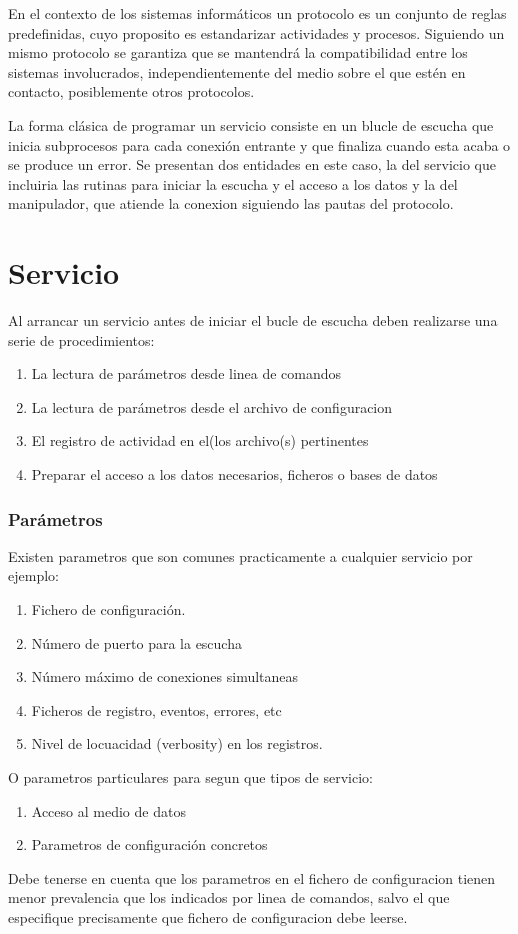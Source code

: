 \documentclass[a4paper,spanish,12pt]{book}
\begin{document}
En el contexto de los sistemas informáticos un protocolo es un conjunto de reglas predefinidas, cuyo proposito es estandarizar actividades y procesos. Siguiendo un mismo protocolo se garantiza que se mantendrá la compatibilidad entre los sistemas involucrados, independientemente del medio sobre el que est\'en en contacto, posiblemente otros protocolos.

La forma cl\'asica de programar un servicio consiste en un blucle de escucha que inicia subprocesos para cada conexi\'on entrante y que finaliza cuando esta acaba o se produce un error. Se presentan dos entidades en este caso, la del servicio que incluiria las rutinas para iniciar la escucha y el acceso a los datos y la del manipulador, que atiende la conexion siguiendo las pautas del protocolo.

\section{Servicio}

Al arrancar un servicio antes de iniciar el bucle de escucha deben realizarse una serie de procedimientos:
\begin{enumerate}
	\item La lectura de parámetros desde linea de comandos
	\item La lectura de parámetros desde el archivo de configuracion
	\item El registro de actividad en el(los archivo(s) pertinentes
	\item Preparar el acceso a los datos necesarios, ficheros o bases de datos
\end{enumerate}

\subsubsection{Parámetros}
Existen parametros que son comunes practicamente a cualquier servicio por ejemplo:
\begin{enumerate}
	\item Fichero de configuraci\'on.
	\item N\'umero de puerto para la escucha
	\item N\'umero m\'aximo de conexiones simultaneas
	\item Ficheros de registro, eventos, errores, etc
	\item Nivel de locuacidad (verbosity) en los registros.
\end{enumerate}
O parametros particulares para segun que tipos de servicio:
\begin{enumerate}
	\item Acceso al medio de datos
	\item Parametros de configuraci\'on concretos
\end{enumerate}
Debe tenerse en cuenta que los parametros en el fichero de configuracion tienen menor prevalencia que los indicados por linea de comandos, salvo el que especifique precisamente que fichero de configuracion debe leerse.
\end{document}
